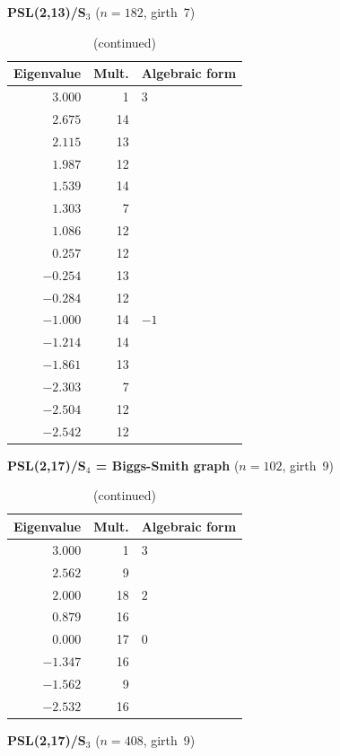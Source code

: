 \documentclass[11pt,a4paper]{amsart}
\theoremstyle{definition}
\theoremstyle{remark}
\begin{document}
\begin{table}[ht]\ContinuedFloat
\caption{(continued)}
\footnotesize
\begin{center}

\noindent\textbf{PSL(2,13)/S$_3$} \quad ($n=182$, girth~7)
\smallskip

\begin{tabular}{rrl}
\toprule
Eigenvalue & Mult. & Algebraic form \\
\midrule
$3.000$ & 1 & $3$ \\
$2.675$ & 14 & \\
$2.115$ & 13 & \\
$1.987$ & 12 & \\
$1.539$ & 14 & \\
$1.303$ & 7 & \\
$1.086$ & 12 & \\
$0.257$ & 12 & \\
$-0.254$ & 13 & \\
$-0.284$ & 12 & \\
$-1.000$ & 14 & $-1$ \\
$-1.214$ & 14 & \\
$-1.861$ & 13 & \\
$-2.303$ & 7 & \\
$-2.504$ & 12 & \\
$-2.542$ & 12 & \\
\bottomrule
\end{tabular}

\bigskip\noindent\textbf{PSL(2,17)/S$_4$ = Biggs-Smith graph} \quad ($n=102$, girth~9)
\smallskip

\begin{tabular}{rrl}
\toprule
Eigenvalue & Mult. & Algebraic form \\
\midrule
$3.000$ & 1 & $3$ \\
$2.562$ & 9 & \\
$2.000$ & 18 & $2$ \\
$0.879$ & 16 & \\
$0.000$ & 17 & $0$ \\
$-1.347$ & 16 & \\
$-1.562$ & 9 & \\
$-2.532$ & 16 & \\
\bottomrule
\end{tabular}

\bigskip\noindent\textbf{PSL(2,17)/S$_3$} \quad ($n=408$, girth~9)
\smallskip


\end{center}
\end{table}
\end{document}
